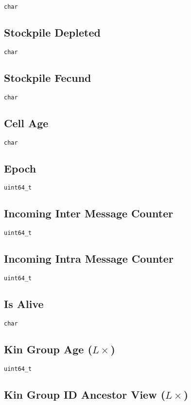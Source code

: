 \texttt{char}

\subsection{Stockpile Depleted}

\texttt{char}

\subsection{Stockpile Fecund}

\texttt{char}

\subsection{Cell Age}

\texttt{char}

\subsection{Epoch}

\texttt{uint64\_t}

\subsection{Incoming Inter Message Counter}

\texttt{uint64\_t}

\subsection{Incoming Intra Message Counter}

\texttt{uint64\_t}

\subsection{Is Alive}

\texttt{char}

\subsection{Kin Group Age ($L\times$)} 

\texttt{uint64\_t}

\subsection{Kin Group ID Ancestor View ($L\times$)}

